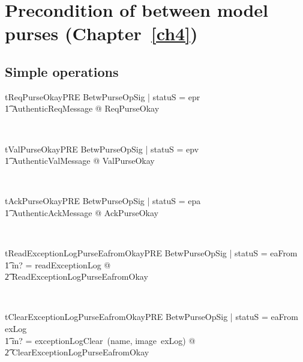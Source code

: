 \section{Precondition of between model purses (Chapter~\ref{ch4})}\label{ch8.ch4}

\subsection*{Simple operations}

\begin{LNewThm}
\begin{theorem}{tReqPurseOkayPRE}
    \forall BetwPurseOpSig | statuS = epr \\
        \t1 \land AuthenticReqMessage @ \pre ReqPurseOkay
\end{theorem}~\end{LNewThm}

\begin{LNewThm}
\begin{theorem}{tValPurseOkayPRE}
    \forall BetwPurseOpSig | statuS = epv \\
        \t1 \land AuthenticValMessage @ \pre ValPurseOkay
\end{theorem}~\end{LNewThm}

\begin{LNewThm}
\begin{theorem}{tAckPurseOkayPRE}
    \forall BetwPurseOpSig | statuS = epa \\
        \t1 \land AuthenticAckMessage @ \pre AckPurseOkay
\end{theorem}~\end{LNewThm}

\begin{LNewThm}
\begin{theorem}{tReadExceptionLogPurseEafromOkayPRE}
    \forall BetwPurseOpSig | statuS = eaFrom \\
        \t1 \land m? = readExceptionLog @ \\
            \t2 \pre ReadExceptionLogPurseEafromOkay
\end{theorem}~\end{LNewThm}

\begin{LNewThm}
\begin{theorem}{tClearExceptionLogPurseEafromOkayPRE}
    \forall BetwPurseOpSig | statuS = eaFrom \land exLog \neq \emptyset \\
        \t1 \land m? = exceptionLogClear~(name, image~exLog) @ \\
            \t2 \pre ClearExceptionLogPurseEafromOkay
\end{theorem}~\end{LNewThm}


